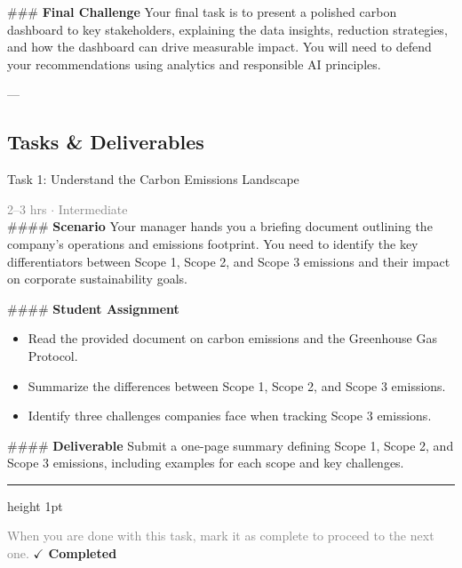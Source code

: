 \documentclass[10pt,a4paper]{article}
\begin{document}
\#\#\# \textbf{Final Challenge}  
Your final task is to present a polished carbon dashboard to key stakeholders, explaining the data insights, reduction strategies, and how the dashboard can drive measurable impact. You will need to defend your recommendations using analytics and responsible AI principles.

---

\subsection*{Tasks \& Deliverables}

\begin{taskbox}{Task 1: Understand the Carbon Emissions Landscape}

    {\small \textcolor{gray}{2--3 hrs $\cdot$ Intermediate}}\\[12pt]

    \#\#\#\# \textbf{Scenario}  
Your manager hands you a briefing document outlining the company’s operations and emissions footprint. You need to identify the key differentiators between Scope 1, Scope 2, and Scope 3 emissions and their impact on corporate sustainability goals.

\#\#\#\# \textbf{Student Assignment}
\begin{itemize}
    \item Read the provided document on carbon emissions and the Greenhouse Gas Protocol.  
    \item Summarize the differences between Scope 1, Scope 2, and Scope 3 emissions.  
    \item Identify three challenges companies face when tracking Scope 3 emissions.
\end{itemize}

\#\#\#\# \textbf{Deliverable}
Submit a one-page summary defining Scope 1, Scope 2, and Scope 3 emissions, including examples for each scope and key challenges.\par

    \vspace{16pt}

    \textcolor{cardBorder}{\hrule height 1pt}\vspace{8pt}

    \small \textcolor{gray}{When you are done with this task, mark it as complete to proceed to the next one.} \hfill \textbf{\textcolor{brandDark}{$\checkmark$ Completed}}

\end{taskbox}
\end{document}

